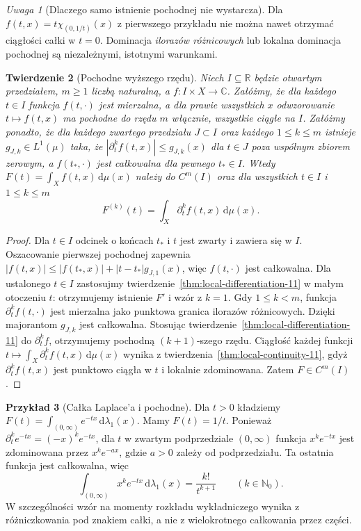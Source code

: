 \documentclass[11pt,a4paper,oneside]{book}
\numberwithin{equation}{chapter}
\theoremstyle{plain}
\newtheorem{twierdzenie}{Twierdzenie}[chapter]
\theoremstyle{definition}
\newtheorem{przyklad}[twierdzenie]{Przykład}
\theoremstyle{remark}
\newtheorem{uwaga}[twierdzenie]{Uwaga}
\begin{document}
\begin{uwaga}[Dlaczego samo istnienie pochodnej nie wystarcza]
Dla $f(t,x)=t\chi_{(0,1/t)}(x)$ z pierwszego przykładu
nie można nawet otrzymać ciągłości całki w $t=0$.
Dominacja \emph{ilorazów różnicowych} lub lokalna dominacja
pochodnej są niezależnymi, istotnymi warunkami.
\end{uwaga}

\begin{twierdzenie}[Pochodne wyższego rzędu]
\label{thm:higher-differentiation-11}
Niech $I\subseteq\mathbb R$ będzie otwartym przedziałem,
$m\ge1$ liczbą naturalną, a $f:I\times X\to\mathbb C$.
Załóżmy, że dla każdego $t\in I$ funkcja $f(t,\cdot)$ jest mierzalna,
a dla prawie wszystkich $x$ odwzorowanie $t\mapsto f(t,x)$
ma pochodne do rzędu $m$ włącznie, wszystkie ciągłe na $I$.
Załóżmy ponadto, że dla każdego zwartego przedziału
$J\subset I$ oraz każdego $1\le k\le m$
istnieje $g_{J,k}\in L^1(\mu)$ taka, że
$|\partial_t^k f(t,x)|\le g_{J,k}(x)$ dla $t\in J$
poza wspólnym zbiorem zerowym, a $f(t_*,\cdot)$ jest
całkowalna dla pewnego $t_*\in I$.
Wtedy $F(t)=\int_Xf(t,x)\,\mathrm d\mu(x)$ należy
do $C^m(I)$ oraz dla wszystkich $t\in I$ i $1\le k\le m$
\begin{equation}\label{eq:higher-param-11}
F^{(k)}(t)=\int_X\partial_t^k f(t,x)\,\mathrm d\mu(x).
\end{equation}
\end{twierdzenie}
\begin{proof}
Dla $t\in I$ odcinek o końcach $t_*$ i $t$ jest zwarty
i zawiera się w $I$. Oszacowanie pierwszej pochodnej
zapewnia $|f(t,x)|\le|f(t_*,x)|+|t-t_*|g_{J,1}(x)$,
więc $f(t,\cdot)$ jest całkowalna. Dla ustalonego
$t\in I$ zastosujmy twierdzenie~\ref{thm:local-differentiation-11}
w małym otoczeniu $t$: otrzymujemy istnienie $F'$ i wzór
z $k=1$. Gdy $1\le k<m$, funkcja $\partial_t^kf(t,\cdot)$
jest mierzalna jako punktowa granica ilorazów różnicowych.
Dzięki majorantom $g_{J,k}$ jest całkowalna. Stosując
twierdzenie~\ref{thm:local-differentiation-11} do
$\partial_t^kf$, otrzymujemy pochodną $(k+1)$-szego rzędu.
Ciągłość każdej funkcji $t\mapsto\int_X\partial_t^kf(t,x)\,\mathrm d\mu(x)$
wynika z twierdzenia~\ref{thm:local-continuity-11},
gdyż $\partial_t^kf(t,x)$ jest punktowo ciągła w $t$
i lokalnie zdominowana. Zatem $F\in C^m(I)$.
\end{proof}

\begin{przyklad}[Całka Laplace'a i pochodne]
\label{ex:laplace-11}
Dla $t>0$ kładziemy $F(t)=\int_{(0,\infty)}e^{-tx}\,\mathrm d\lambda_1(x)$.
Mamy $F(t)=1/t$. Ponieważ
$\partial_t^k e^{-tx}=(-x)^k e^{-tx}$, dla
$t$ w zwartym podprzedziale $(0,\infty)$ funkcja
$x^k e^{-tx}$ jest zdominowana przez
$x^ke^{-ax}$, gdzie $a>0$ zależy od podprzedziału.
Ta ostatnia funkcja jest całkowalna, więc
\[
\int_{(0,\infty)}x^ke^{-tx}\,\mathrm d\lambda_1(x)
=\frac{k!}{t^{k+1}}\qquad(k\in\mathbb N_0).
\]
W szczególności wzór na momenty rozkładu wykładniczego
wynika z różniczkowania pod znakiem całki, a nie z
wielokrotnego całkowania przez części.
\end{przyklad}
\end{document}
